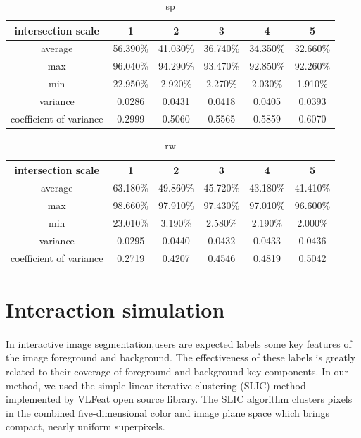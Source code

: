 \documentclass[runningheads,a4paper]{llncs}
\begin{document}
\begin{table}
\centering
\begin{tabular}{|c|c|c|c|c|c|}
\hline
intersection scale & 1 & 2 & 3 & 4& 5 \\
\hline
average& 56.390\% & 41.030\% & 36.740\% & 34.350\%& 32.660\% \\
\hline
max& 96.040\% & 94.290\% & 93.470\% & 92.850\%& 92.260\% \\
\hline
min& 22.950\% & 2.920\% & 2.270\% & 2.030\%& 1.910\%\\
\hline
variance& 0.0286 & 0.0431 & 0.0418& 0.0405&0.0393 \\
\hline
coefficient of variance& 0.2999 & 0.5060 & 0.5565 & 0.5859& 0.6070\\
\hline
\end{tabular}
\caption{sp}
\end{table} 

\begin{table}
\centering
\begin{tabular}{|c|c|c|c|c|c|}
\hline
intersection scale & 1 & 2 & 3 & 4& 5 \\
\hline
average& 63.180\% & 49.860\% & 45.720\% & 43.180\%& 41.410\% \\
\hline
max& 98.660\% & 97.910\% & 97.430\% & 97.010\%& 96.600\% \\
\hline
min& 23.010\% & 3.190\% & 2.580\% & 2.190\%& 2.000\%\\
\hline
variance& 0.0295 & 0.0440 & 0.0432 & 0.0433& 0.0436 \\
\hline
coefficient of variance& 0.2719 & 0.4207 & 0.4546 & 0.4819& 0.5042\\
\hline
\end{tabular}
\caption{rw}
\end{table} 



\section{Interaction simulation}
\paragraph{} In interactive image segmentation,users are expected labels some key features of the image foreground and background. The effectiveness of these labels is greatly related to their coverage of foreground and background key components. In our method, we used the simple linear iterative clustering (SLIC)  method \citep{achanta2010slic} implemented by VLFeat open source library\citep{vedaldi08vlfeat}. The SLIC algorithm clusters pixels in the combined five-dimensional color and image plane space which brings compact, nearly uniform superpixels. 








\end{document}
